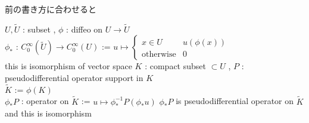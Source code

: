 \documentclass[dvipdfmx]{jsarticle}
\begin{document}
前の書き方に合わせると
\begin{Theorem}
\itemdefi
  \For \(U , \tilde{U}\) : subset , \(\phi\) : diffeo on \(U \to \tilde{U}\) \\
  \Define \(\phi_*\) : \(C^\infty_0(\tilde{U}) \to C^\infty_0(U)\) :=
  \(u \mapsto
  \left\{
    \begin{array}{ll}
    x \in U & u(\phi(x)) \\
    \text{otherwise} & 0
    \end{array}
  \right.\) \\
  \Then this is isomorphism of vector space
\itemdefi
  \For \(K\) : compact subset \(\subset U\) , \(P\) : pseudodifferential operator support in \(K\) \\
  \Let \(\tilde{K}\) := \(\phi(K)\) \\
  \Define \(\phi_* P\) : operator on \(\tilde{K}\) := \(u \mapsto \phi_*^{-1} P(\phi_* u)\)
\itemprop
  \Then \(\phi_* P\) is pseudodifferential operator on \(\tilde{K}\) \\
  \Then and this is isomorphism
\end{Theorem}
\end{document}
